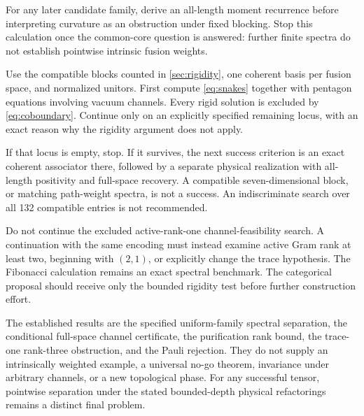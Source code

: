 \documentclass[aps,pra,reprint,nofootinbib,onecolumn]{revtex4-2}
\begin{document}
\begin{description}
	      For any later candidate family, derive an all-length moment recurrence
	      before interpreting curvature as an obstruction under fixed blocking.
	      Stop this calculation once the common-core question is answered:
	      further finite spectra do not establish pointwise intrinsic fusion
	      weights.

	\item[Priority C: categorical rigidity gate.]
	      Use the compatible blocks counted in \cref{sec:rigidity}, one coherent
	      basis per fusion space, and normalized unitors.
	      First compute \cref{eq:snakes} together with pentagon equations
	      involving vacuum channels.
	      Every rigid solution is excluded by \cref{eq:coboundary}.
	      Continue only on an explicitly specified remaining locus, with an
	      exact reason why the rigidity argument does not apply.

	      If that locus is empty, stop. If it survives, the next success
	      criterion is an exact coherent associator there, followed by a
	      separate physical realization with all-length positivity and
	      full-space recovery. A compatible seven-dimensional block, or matching
	      path-weight spectra, is not a success. An indiscriminate search over
	      all 132 compatible entries is not recommended.
\end{description}

Do not continue the excluded active-rank-one channel-feasibility
search. A continuation with the same encoding must instead examine
active Gram rank at least two, beginning with $(2,1)$, or explicitly
change the trace hypothesis. The Fibonacci calculation remains an
exact spectral benchmark. The categorical proposal should receive
only the bounded rigidity test before further construction effort.

The established results are the specified uniform-family spectral
separation, the conditional full-space channel certificate, the
purification rank bound, the trace-one rank-three obstruction, and
the Pauli rejection. They do not supply an intrinsically weighted
example, a universal no-go theorem, invariance under arbitrary channels,
or a new topological phase. For any successful tensor, pointwise
separation under the stated bounded-depth physical refactorings remains
a distinct final problem.


\end{document}
